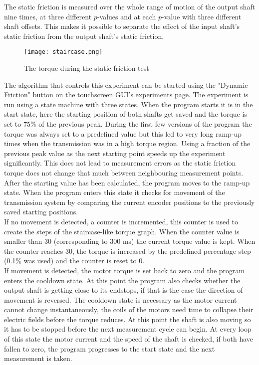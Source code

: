 \documentclass[12pt]{article}
\begin{document}
The static friction is measured over the whole range of motion of the output shaft nine times, at three different $p$-values and at each $p$-value with three different shaft offsets. This makes it possible to separate the effect of the input shaft's static friction from the output shaft's static friction.\\

\begin{figure}[h]
    \centering
    \texttt{[image: staircase.png]}
    \caption{The torque during the static friction test}
    \label{fig:staticFricTorqueTime}
\end{figure}

The algorithm that controls this experiment can be started using the "Dynamic Friction" button on the touchscreen GUI's experiments page. The experiment is run using a state machine with three states. When the program starts it is in the start state, here the starting position of both shafts get saved and the torque is set to 75\% of the previous peak. During the first few versions of the program the torque was always set to a predefined value but this led to very long ramp-up times when the transmission was in a high torque region. Using a fraction of the previous peak value as the next starting point speeds up the experiment significantly. This does not lead to measurement errors as the static friction torque does not change that much between neighbouring measurement points. \\

After the starting value has been calculated, the program moves to the ramp-up state. When the program enters this state it checks for movement of the transmission system by comparing the current encoder positions to the previously saved starting positions.  \\

If no movement is detected, a counter is incremented, this counter is used to create the steps of the staircase-like torque graph. When the counter value is smaller than 30 (corresponding to 300 ms) the current torque value is kept. When the counter reaches 30, the torque is increased by the predefined percentage step (0.1\% was used) and the counter is reset to 0.\\

If movement is detected, the motor torque is set back to zero and the program enters the cooldown state. At this point the program also checks whether the output shaft is getting close to its endstops, if that is the case the direction of movement is reversed.
The cooldown state is necessary as the motor current cannot change instantaneously, the coils of the motors need time to collapse their electric fields before the torque reduces. At this point the shaft is also moving so it has to be stopped before the next measurement cycle can begin. At every loop of this state the motor current and the speed of the shaft is checked, if both have fallen to zero, the program progresses to the start state and the next measurement is taken.
\end{document}
